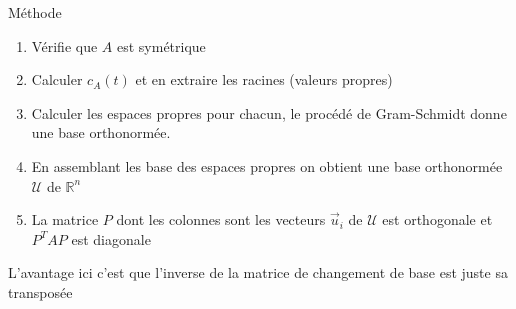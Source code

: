 \begin{parag}{Méthode}
\begin{enumerate}
    \item Vérifie que $A$ est symétrique
    \item Calculer $c_A(t)$ et en extraire les racines (valeurs propres)
    \item Calculer les espaces propres pour chacun, le procédé de Gram-Schmidt donne une base orthonormée.
    \item En assemblant les base des espaces propres on obtient une base orthonormée $\mathcal{U}$ de $\mathbb{R}^n$
    \item La matrice $P$ dont les colonnes sont les vecteurs $\vec{u}_i$ de $\mathcal{U}$ est orthogonale et $P^TAP$ est diagonale
\end{enumerate}   
\begin{framedremark}
    L'avantage ici c'est que l'inverse de la matrice de changement de base est juste sa transposée
\end{framedremark}
\end{parag}
